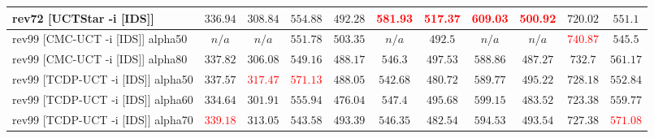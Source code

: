 \documentclass{article}
\begin{document}
\begin{tabular}{|l|r@{$\pm$}rr@{$\pm$}rr@{$\pm$}rr@{$\pm$}rr@{$\pm$}rr@{$\pm$}rr@{$\pm$}rr@{$\pm$}rr@{$\pm$}rr@{$\pm$}r|}
\\
rev72 [UCTStar -i [IDS]]
& \multicolumn{2}{c}{$336.94$}
& \multicolumn{2}{c}{$308.84$}
& \multicolumn{2}{c}{$554.88$}
& \multicolumn{2}{c}{$492.28$}
& \multicolumn{2}{c}{\textbf{\textcolor{red}{581.93}}}
& \multicolumn{2}{c}{\textbf{\textcolor{red}{517.37}}}
& \multicolumn{2}{c}{\textbf{\textcolor{red}{609.03}}}
& \multicolumn{2}{c}{\textbf{\textcolor{red}{500.92}}}
& \multicolumn{2}{c}{$720.02$}
& \multicolumn{2}{c|}{$551.1$}
\\
\hline
rev99 [CMC-UCT -i [IDS]] alpha50
& \multicolumn{2}{c}{\textbf{$n/a$}}
& \multicolumn{2}{c}{\textbf{$n/a$}}
& \multicolumn{2}{c}{$551.78$}
& \multicolumn{2}{c}{\textbf{$503.35$}}
& \multicolumn{2}{c}{\textbf{$n/a$}}
& \multicolumn{2}{c}{$492.5$}
& \multicolumn{2}{c}{\textbf{$n/a$}}
& \multicolumn{2}{c}{\textbf{$n/a$}}
& \multicolumn{2}{c}{\textbf{\textcolor{red}{$740.87$}}}
& \multicolumn{2}{c|}{$545.5$}
\\
rev99 [CMC-UCT -i [IDS]] alpha80
& \multicolumn{2}{c}{\textbf{$337.82$}}
& \multicolumn{2}{c}{$306.08$}
& \multicolumn{2}{c}{$549.16$}
& \multicolumn{2}{c}{$488.17$}
& \multicolumn{2}{c}{$546.3$}
& \multicolumn{2}{c}{$497.53$}
& \multicolumn{2}{c}{$588.86$}
& \multicolumn{2}{c}{$487.27$}
& \multicolumn{2}{c}{$732.7$}
& \multicolumn{2}{c|}{$561.17$}
\\
rev99 [TCDP-UCT -i [IDS]] alpha50
& \multicolumn{2}{c}{\textbf{$337.57$}}
& \multicolumn{2}{c}{\textbf{\textcolor{red}{$317.47$}}}
& \multicolumn{2}{c}{\textbf{\textcolor{red}{$571.13$}}}
& \multicolumn{2}{c}{$488.05$}
& \multicolumn{2}{c}{$542.68$}
& \multicolumn{2}{c}{$480.72$}
& \multicolumn{2}{c}{$589.77$}
& \multicolumn{2}{c}{$495.22$}
& \multicolumn{2}{c}{$728.18$}
& \multicolumn{2}{c|}{$552.84$}
\\
rev99 [TCDP-UCT -i [IDS]] alpha60
& \multicolumn{2}{c}{\textbf{$334.64$}}
& \multicolumn{2}{c}{$301.91$}
& \multicolumn{2}{c}{$555.94$}
& \multicolumn{2}{c}{$476.04$}
& \multicolumn{2}{c}{$547.4$}
& \multicolumn{2}{c}{$495.68$}
& \multicolumn{2}{c}{$599.15$}
& \multicolumn{2}{c}{$483.52$}
& \multicolumn{2}{c}{$723.38$}
& \multicolumn{2}{c|}{$559.77$}
\\
rev99 [TCDP-UCT -i [IDS]] alpha70
& \multicolumn{2}{c}{\textbf{\textcolor{red}{$339.18$}}}
& \multicolumn{2}{c}{\textbf{$313.05$}}
& \multicolumn{2}{c}{$543.58$}
& \multicolumn{2}{c}{$493.39$}
& \multicolumn{2}{c}{$546.35$}
& \multicolumn{2}{c}{$482.54$}
& \multicolumn{2}{c}{$594.53$}
& \multicolumn{2}{c}{$493.54$}
& \multicolumn{2}{c}{$727.38$}
& \multicolumn{2}{c|}{\textbf{\textcolor{red}{$571.08$}}}

\end{tabular}
\end{document}

